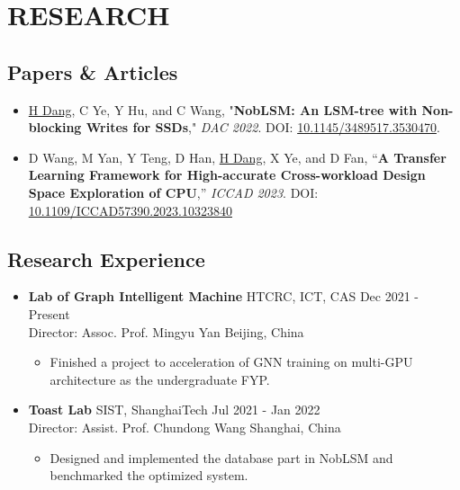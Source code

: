 \documentclass[a4paper,10pt]{ctexart} %
\begin{document}

\section{RESEARCH}

    \subsection{Papers \& Articles}

        \begin{itemize}
            \item \underline{H Dang}, C Ye, Y Hu, and C Wang, "\textbf{NobLSM: An LSM-tree with Non-blocking Writes for SSDs}," \textit{DAC 2022}. DOI: \href{https://doi.org/10.1145/3489517.3530470}{10.1145/3489517.3530470}.
            \item D Wang, M Yan, Y Teng, D Han, \underline{H Dang}, X Ye, and D Fan, “\textbf{A Transfer Learning Framework for High-accurate Cross-workload Design Space Exploration of CPU},” \textit{ICCAD 2023}. DOI: \href{https://doi.org/10.1109/ICCAD57390.2023.10323840}{10.1109/ICCAD57390.2023.10323840}
        \end{itemize}

    \subsection{Research Experience}

    \begin{itemize}
        \item \textbf{Lab of Graph Intelligent Machine} \quad HTCRC, ICT, CAS \hfill Dec 2021 - Present \\
        {\small Director: Assoc. Prof. Mingyu Yan} \hfill Beijing, China
        \begin{small}
            \begin{itemize}
                \item Finished a project to acceleration of GNN training on multi-GPU architecture as the undergraduate FYP.
            \end{itemize}
        \end{small}
    \end{itemize}

    \begin{itemize}
        \item \textbf{Toast Lab} \quad SIST, ShanghaiTech \hfill Jul 2021 - Jan 2022 \\
        {\small Director: Assist. Prof. Chundong Wang} \hfill Shanghai, China
        \begin{small}
            \begin{itemize}
                \item Designed and implemented the database part in NobLSM and benchmarked the optimized system.
            \end{itemize}
        \end{small}
    \end{itemize}
\end{document}
